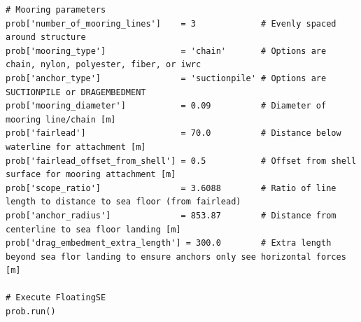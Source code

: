 \begin{lstlisting}
# Mooring parameters
prob['number_of_mooring_lines']    = 3             # Evenly spaced around structure
prob['mooring_type']               = 'chain'       # Options are chain, nylon, polyester, fiber, or iwrc
prob['anchor_type']                = 'suctionpile' # Options are SUCTIONPILE or DRAGEMBEDMENT
prob['mooring_diameter']           = 0.09          # Diameter of mooring line/chain [m]
prob['fairlead']                   = 70.0          # Distance below waterline for attachment [m]
prob['fairlead_offset_from_shell'] = 0.5           # Offset from shell surface for mooring attachment [m]
prob['scope_ratio']                = 3.6088        # Ratio of line length to distance to sea floor (from fairlead)
prob['anchor_radius']              = 853.87        # Distance from centerline to sea floor landing [m]
prob['drag_embedment_extra_length'] = 300.0        # Extra length beyond sea flor landing to ensure anchors only see horizontal forces [m]

# Execute FloatingSE
prob.run()

\end{lstlisting}

